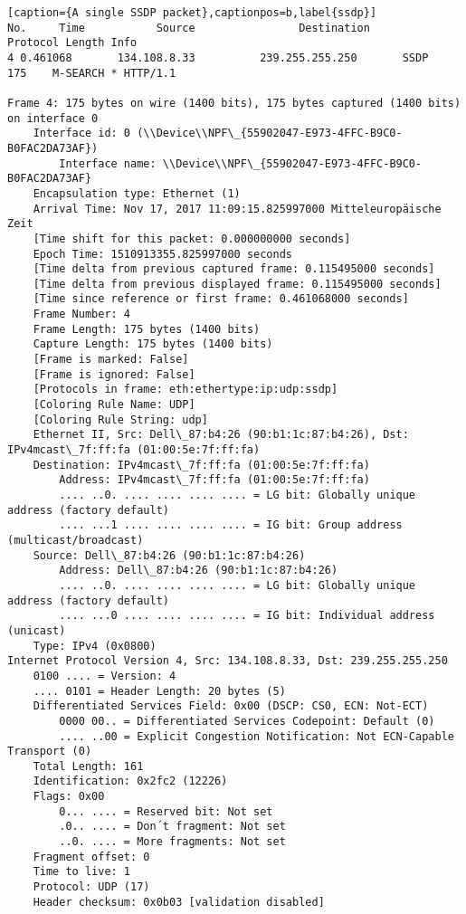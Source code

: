  \begin{lstlisting}[caption={A single SSDP packet},captionpos=b,label{ssdp}]
No.     Time           Source                Destination           Protocol Length Info
4 0.461068       134.108.8.33          239.255.255.250       SSDP     175    M-SEARCH * HTTP/1.1 

Frame 4: 175 bytes on wire (1400 bits), 175 bytes captured (1400 bits) on interface 0
	Interface id: 0 (\\Device\\NPF\_{55902047-E973-4FFC-B9C0-B0FAC2DA73AF})
		Interface name: \\Device\\NPF\_{55902047-E973-4FFC-B9C0-B0FAC2DA73AF}
	Encapsulation type: Ethernet (1)
	Arrival Time: Nov 17, 2017 11:09:15.825997000 Mitteleuropäische Zeit
	[Time shift for this packet: 0.000000000 seconds]
	Epoch Time: 1510913355.825997000 seconds
	[Time delta from previous captured frame: 0.115495000 seconds]
	[Time delta from previous displayed frame: 0.115495000 seconds]
	[Time since reference or first frame: 0.461068000 seconds]
	Frame Number: 4
	Frame Length: 175 bytes (1400 bits)
	Capture Length: 175 bytes (1400 bits)
	[Frame is marked: False]
	[Frame is ignored: False]
	[Protocols in frame: eth:ethertype:ip:udp:ssdp]
	[Coloring Rule Name: UDP]
	[Coloring Rule String: udp]
	Ethernet II, Src: Dell\_87:b4:26 (90:b1:1c:87:b4:26), Dst: IPv4mcast\_7f:ff:fa (01:00:5e:7f:ff:fa)
	Destination: IPv4mcast\_7f:ff:fa (01:00:5e:7f:ff:fa)
		Address: IPv4mcast\_7f:ff:fa (01:00:5e:7f:ff:fa)
		.... ..0. .... .... .... .... = LG bit: Globally unique address (factory default)
		.... ...1 .... .... .... .... = IG bit: Group address (multicast/broadcast)
	Source: Dell\_87:b4:26 (90:b1:1c:87:b4:26)
		Address: Dell\_87:b4:26 (90:b1:1c:87:b4:26)
		.... ..0. .... .... .... .... = LG bit: Globally unique address (factory default)
		.... ...0 .... .... .... .... = IG bit: Individual address (unicast)
	Type: IPv4 (0x0800)
Internet Protocol Version 4, Src: 134.108.8.33, Dst: 239.255.255.250
	0100 .... = Version: 4
	.... 0101 = Header Length: 20 bytes (5)
	Differentiated Services Field: 0x00 (DSCP: CS0, ECN: Not-ECT)
		0000 00.. = Differentiated Services Codepoint: Default (0)
		.... ..00 = Explicit Congestion Notification: Not ECN-Capable Transport (0)
	Total Length: 161
	Identification: 0x2fc2 (12226)
	Flags: 0x00
		0... .... = Reserved bit: Not set
		.0.. .... = Don´t fragment: Not set
		..0. .... = More fragments: Not set
	Fragment offset: 0
	Time to live: 1
	Protocol: UDP (17)
	Header checksum: 0x0b03 [validation disabled]

\end{lstlisting}
